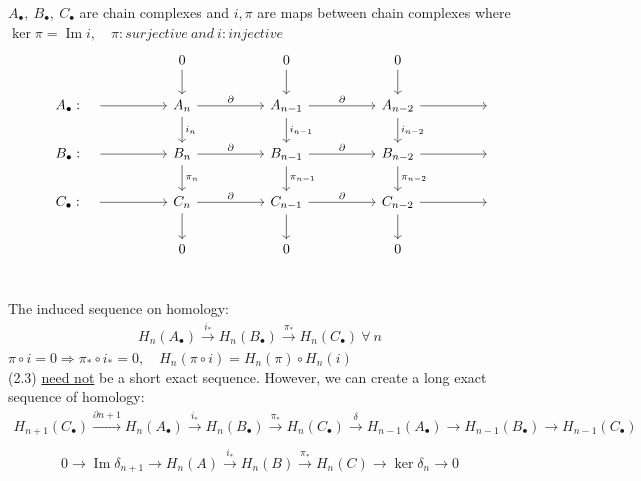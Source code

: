 \documentclass[11pt,a4paper]{report}
\DeclareMathOperator{\Ima}{Im}
\begin{document}
                $A_\bullet, \ B_\bullet, \ C_\bullet$ are chain complexes and $i, \pi$ are maps between chain complexes where \\
                $\ker \pi = \Ima i, \quad \pi:surjective \ and \ i: injective$\\
                \[
                  \begin{tikzcd}[ampersand replacement=\&]
                    \& \            \& \& 0 \arrow[d]                   \&  \& 0      \arrow[d]                 \&  \& 0 \arrow[d] \\
                    \& A_\bullet: \quad \arrow[rr] \& \& A_n \arrow[rr, "\partial"] \arrow[d, "i_n"] \&  \& A_{n-1} \arrow[rr, "\partial"] \arrow[d, "i_{n-1}"] \&  \& A_{n-2} \arrow[d, "i_{n-2}"] \arrow[rr] \& \& \ \\
                    \& B_\bullet: \quad \arrow[rr] \& \& B_n \arrow[rr, "\partial"] \arrow[d, "\pi_n"] \&  \& B_{n-1} \arrow[rr, "\partial"] \arrow[d, "\pi_{n-1}"] \&  \& B_{n-2} \arrow[d, "\pi_{n-2}"] \arrow[rr] \& \& \ \\
                    \& C_\bullet: \quad \arrow[rr] \& \& C_n \arrow[rr, "\partial"] \arrow[d] \&  \& C_{n-1} \arrow[rr, "\partial"] \arrow[d] \&  \& C_{n-2} \arrow[d] \arrow[rr] \& \& \ \\
                    \& \            \& \& 0                             \&  \& 0                                 \&  \& 0\\
                  \end{tikzcd}
                \]


                The induced sequence on homology: \\
                \begin{align}
                H_n(A_\bullet) \xrightarrow{i_*} H_n(B_\bullet) \xrightarrow{\pi_*} H_n(C_\bullet) \ \forall \  n
                \end{align}
                $\pi \circ i = 0 \Rightarrow \pi_* \circ i_* = 0, \quad H_n(\pi \circ i) = H_n(\pi) \circ H_n(i)$\\
                (2.3) \underline{need not} be a short exact sequence. However, we can create a long exact sequence of homology: \\

                 \begin{align*}
                H_{n+1}(C_\bullet) \xrightarrow{\partial n+1} H_n(A_\bullet) \xrightarrow{i_*} H_n(B_\bullet) \xrightarrow{\pi_*} H_n(C_\bullet) \xrightarrow{\delta} H_{n-1}(A_\bullet) \rightarrow H_{n-1}(B_\bullet) \rightarrow H_{n-1}(C_\bullet) \\
                \end{align*}
                \begin{align*}
                0 \rightarrow \Ima \delta_{n+1} \rightarrow H_n(A) \xrightarrow{i_*} H_n(B) \xrightarrow{\pi_*} H_n(C) \rightarrow \ker \delta_n \rightarrow 0 \\
                \\
                \end{align*}
\end{document}
